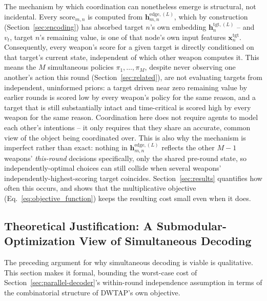 \documentclass[smallcondensed]{svjour3}
\begin{document}
The mechanism by which coordination can nonetheless emerge is structural, not incidental. Every $\text{score}_{m,n}$ is computed from $\bm{h}_{m,n}^{\text{edge},(L)}$, which by construction (Section~\ref{sec:encoding}) has absorbed target $n$'s own embedding $\bm{h}_n^{\text{tgt},(L)}$ -- and $v_t$, target $n$'s remaining value, is one of that node's own input features $\bm{x}_n^{\text{tgt}}$. Consequently, every weapon's score for a given target is directly conditioned on that target's current state, independent of which other weapon computes it. This means the $M$ simultaneous policies $\pi_1, \ldots, \pi_M$, despite never observing one another's action this round (Section~\ref{sec:related}), are not evaluating targets from independent, uninformed priors: a target driven near zero remaining value by earlier rounds is scored low by every weapon's policy for the same reason, and a target that is still substantially intact and time-critical is scored high by every weapon for the same reason. Coordination here does not require agents to model each other's intentions -- it only requires that they share an accurate, common view of the object being coordinated over. This is also why the mechanism is imperfect rather than exact: nothing in $\bm{h}_{m,n}^{\text{edge},(L)}$ reflects the other $M-1$ weapons' \emph{this-round} decisions specifically, only the shared pre-round state, so independently-optimal choices can still collide when several weapons' independently-highest-scoring target coincides. Section~\ref{sec:results} quantifies how often this occurs, and shows that the multiplicative objective (Eq.~\eqref{eq:objective_function}) keeps the resulting cost small even when it does.

\subsection{Theoretical Justification: A Submodular-Optimization View of Simultaneous Decoding}
\label{sec:submodular}

The preceding argument for why simultaneous decoding is viable is qualitative. This section makes it formal, bounding the worst-case cost of Section~\ref{sec:parallel-decoder}'s within-round independence assumption in terms of the combinatorial structure of DWTAP's own objective.
\end{document}
